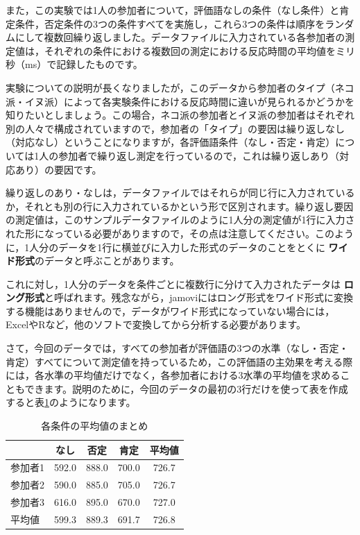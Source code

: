\documentclass[
  12pt,
  a5jpaper,
  lualatex, ja=standard]{bxjsbook}
\renewcommand{\emph}[1]{\textbf{\color{emph} #1}}
\begin{document}
また，この実験では1人の参加者について，評価語なしの条件（なし条件）と肯定条件，否定条件の3つの条件すべてを実施し，これら3つの条件は順序をランダムにして複数回繰り返しました。データファイルに入力されている各参加者の測定値は，それぞれの条件における複数回の測定における反応時間の平均値をミリ秒（ms）で記録したものです。

実験についての説明が長くなりましたが，このデータから参加者のタイプ（ネコ派・イヌ派）によって各実験条件における反応時間に違いが見られるかどうかを知りたいとしましょう。この場合，ネコ派の参加者とイヌ派の参加者はそれぞれ別の人々で構成されていますので，参加者の「タイプ」の要因は繰り返しなし（対応なし）ということになりますが，各評価語条件（なし・否定・肯定）については1人の参加者で繰り返し測定を行っているので，これは繰り返しあり（対応あり）の要因です。

繰り返しのあり・なしは，データファイルではそれらが同じ行に入力されているか，それとも別の行に入力されているかという形で区別されます。繰り返し要因の測定値は，このサンプルデータファイルのように1人分の測定値が1行に入力された形になっている必要がありますので，その点は注意してください。このように，1人分のデータを1行に横並びに入力した形式のデータのことをとくに\emph{ワイド形式}のデータと呼ぶことがあります。

これに対し，1人分のデータを条件ごとに複数行に分けて入力されたデータは\emph{ロング形式}と呼ばれます。残念ながら，jamoviにはロング形式をワイド形式に変換する機能はありませんので，データがワイド形式になっていない場合には，ExcelやRなど，他のソフトで変換してから分析する必要があります。

さて，今回のデータでは，すべての参加者が評価語の3つの水準（なし・否定・肯定）すべてについて測定値を持っているため，この評価語の主効果を考える際には，各水準の平均値だけでなく，各参加者における3水準の平均値を求めることもできます。説明のために，今回のデータの最初の3行だけを使って表を作成すると表\ref{tab:ANOVA-anova-first-three-lines}のようになります。

\begin{table}[H]

\caption{\label{tab:ANOVA-anova-first-three-lines}各条件の平均値のまとめ}
\centering
\begin{tabular}[t]{lcccc}
\toprule
  & なし & 否定 & 肯定 & 平均値\\
\midrule
参加者1 & 592.0 & 888.0 & 700.0 & 726.7\\
参加者2 & 590.0 & 885.0 & 705.0 & 726.7\\
参加者3 & 616.0 & 895.0 & 670.0 & 727.0\\
平均値 & 599.3 & 889.3 & 691.7 & 726.8\\
\bottomrule
\end{tabular}
\end{table}
\end{document}
